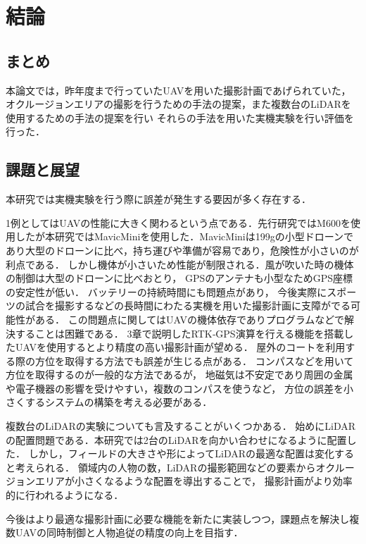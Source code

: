 \documentclass[autodetect-engine,dvipdfmx-if-dvi,ja=standard,a4j,jbase=11pt,magstyle=nomag*]{bxjsreport}
\begin{document}
\chapter{結論}

\section{まとめ}
本論文では，昨年度まで行っていたUAVを用いた撮影計画であげられていた，
オクルージョンエリアの撮影を行うための手法の提案，また複数台のLiDARを使用するための手法の提案を行い
それらの手法を用いた実機実験を行い評価を行った．

\section{課題と展望}
本研究では実機実験を行う際に誤差が発生する要因が多く存在する．

1例としてはUAVの性能に大きく関わるという点である．先行研究ではM600を使用したが本研究ではMavicMiniを使用した．MavicMiniは199gの小型ドローンであり大型のドローンに比べ，持ち運びや準備が容易であり，危険性が小さいのが利点である．
しかし機体が小さいため性能が制限される．風が吹いた時の機体の制御は大型のドローンに比べおとり，
GPSのアンテナも小型なためGPS座標の安定性が低い．
バッテリーの持続時間にも問題点があり，
今後実際にスポーツの試合を撮影するなどの長時間にわたる実機を用いた撮影計画に支障がでる可能性がある．
この問題点に関してはUAVの機体依存でありプログラムなどで解決することは困難である．
3章で説明したRTK‐GPS演算を行える機能を搭載したUAVを使用するとより精度の高い撮影計画が望める．
屋外のコートを利用する際の方位を取得する方法でも誤差が生じる点がある．
コンパスなどを用いて方位を取得するのが一般的な方法であるが，
地磁気は不安定であり周囲の金属や電子機器の影響を受けやすい，複数のコンパスを使うなど，
方位の誤差を小さくするシステムの構築を考える必要がある．

複数台のLiDARの実験についても言及することがいくつかある．
始めにLiDARの配置問題である．本研究では2台のLiDARを向かい合わせになるように配置した．
しかし，フィールドの大きさや形によってLiDARの最適な配置は変化すると考えられる．
領域内の人物の数，LiDARの撮影範囲などの要素からオクルージョンエリアが小さくなるような配置を導出することで，
撮影計画がより効率的に行われるようになる．

今後はより最適な撮影計画に必要な機能を新たに実装しつつ，課題点を解決し複数UAVの同時制御と人物追従の精度の向上を目指す．
\end{document}

